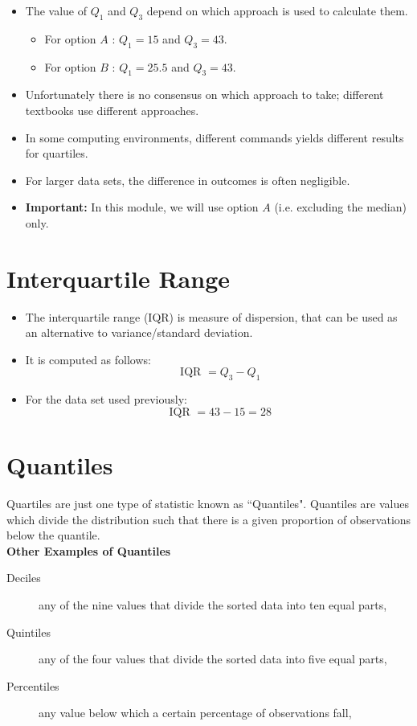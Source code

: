 \documentclass[a4paper,12pt]{article}
\begin{document}
	\begin{itemize}
		\item The value of $Q_1$ and $Q_3$ depend on which approach is used to calculate them.
		\begin{itemize}
			\item For option $A$ : $Q_1 = 15$ and $Q_3 = 43$.
			\item For option $B$ : $Q_1 = 25.5$ and $Q_3 = 43$.
		\end{itemize}
		\item Unfortunately there is no consensus on which approach to take; different textbooks use different approaches.
		\item In some computing environments, different commands yields different results for quartiles.
		\item For larger data sets, the difference in outcomes is often negligible.
		\item \textbf{Important:} In this module, we will use option $A$ (i.e. excluding the median) only.
	\end{itemize}

\newpage	
\section*{Interquartile Range}
	\begin{itemize}
		\item The interquartile range (IQR) is measure of dispersion, that can be used as an alternative to variance/standard deviation.
		\item It is computed as follows:  \[ \mbox{ IQR }  = Q_3 - Q_1 \]
		\item For the data set used previously:
		\[ \mbox{ IQR }  = 43 - 15  = 28 \]
	\end{itemize}
	
\section*{Quantiles}
	Quartiles are just one type of statistic known as ``Quantiles".
	Quantiles are values which divide the distribution such that there is a given proportion of observations below the quantile.\\ \bigskip
	\textbf{Other Examples of Quantiles}\\
	\begin{description}
		\item[Deciles]  any of the nine values that divide the sorted data into ten equal parts,
		\item[Quintiles] any of the four values that divide the sorted data into five equal parts,
		\item[Percentiles]any value below which a certain percentage of observations fall,
	\end{description}
	
\end{document}
